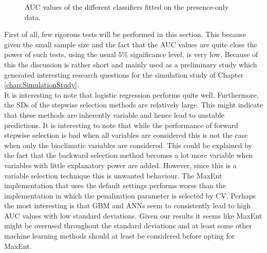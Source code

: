 \begin{figure}[!htb]
\center
{}
\caption{\label{fig:PrOnlyAUC}AUC values of the different classifiers fitted on the presence-only data.}
\end{figure}

First of all, few rigorous tests will be performed in this section. This because given the small sample size and the fact that the AUC values are quite close the power of such tests, using the usual $5\%$ significance level, is very low. Because of this the discussion is rather short and mainly used as a preliminary study which generated interesting research questions for the simulation study of Chapter \ref{chap:SimulationStudy}. \\

It is interesting to note that logistic regression performs quite well. Furthermore, the SDs of the stepwise selection methods are relatively large. This might indicate that these methods are inherently variable and hence lead to unstable predictions. It is interesting to note that while the performance of forward stepwise selection is bad when all variables are considered this is not the case when only the bioclimatic variables are considered. This could be explained by the fact that the backward selection method becomes a lot more variable when variables with little explanatory power are added. However, since this is a variable selection technique this is unwanted behaviour. The MaxEnt implementation that uses the default settings performs worse than the implementation in which the penalization parameter is selected by CV. Perhaps the most interesting is that GBM and ANNs seem to consistently lead to high AUC values with low standard deviations. Given our results it seems like MaxEnt might be overused throughout the standard deviations and at least some other machine learning methods should at least be considered before opting for MaxEnt. \\

